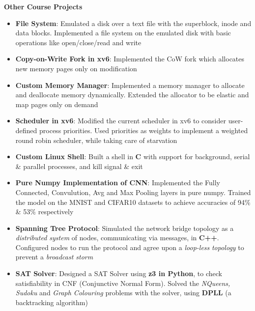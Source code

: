 \documentclass{article}
\begin{document}
\vspace{-5pt}
\textbf{Other Course Projects}\\
\vspace{-18.5pt}
\begin{itemize}[itemsep = -1.25 mm, leftmargin=*]
\item \textbf{File System}: Emulated a disk over a text file with the superblock, inode and data blocks. Implemented a file system on\vspace{-0.25mm} the emulated disk with basic operations like open/close/read and write
\item \textbf{Copy-on-Write Fork in xv6}: Implemented the CoW fork which allocates new memory pages only on modification %
\item \textbf{Custom Memory Manager}:  Implemented a memory manager to allocate and deallocate memory dynamically. Extended\vspace{-0.25mm} the allocator to be elastic and map pages only on demand
\item \textbf{Scheduler in xv6}: Modified the current scheduler in xv6 to consider user-defined process priorities. Used priorities as\vspace{-0.25mm} weights to implement a weighted round robin scheduler, while taking care of starvation
\item \textbf{Custom Linux Shell}: Built a shell in \textbf{C} with support for background, serial \& parallel processes, and kill signal \& exit
\item \textbf{Pure Numpy Implementation of CNN}: Implemented the Fully Connected, Convulution, Avg and Max Pooling layers\vspace{-0.25mm} in pure numpy. Trained the model on the MNIST and CIFAR10 datasets to achieve accuracies of 94\% \& 53\% respectively
\item \textbf{Spanning Tree Protocol}: Simulated the network bridge topology as a \textit{distributed system} of nodes, communicating via\vspace{-0.25mm} messages, in \textbf{C++}. Configured nodes to run the protocol and agree upon a \textit{loop-less} \textit{topology} to prevent a \textit{broadcast storm}
\item \textbf{SAT Solver}: Designed a SAT Solver using \textbf{z3 in Python}, to check satisfiability in CNF (Conjunctive Normal Form).\vspace{-0.25mm} Solved the \textit{NQueens, Sudoku} and \textit{Graph Colouring} problems with the solver, using \textbf{DPLL} (a backtracking algorithm)

\end{itemize}
\end{document}
